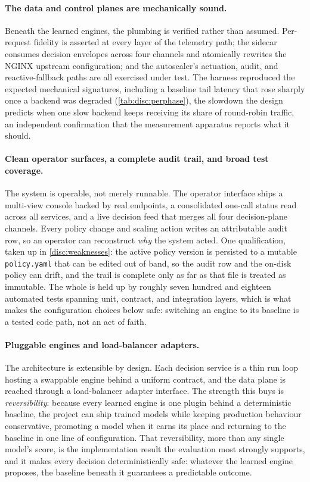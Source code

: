 \paragraph{The data and control planes are mechanically sound.} Beneath the learned
engines, the plumbing is verified rather than assumed. Per-request fidelity is
asserted at every layer of the telemetry path; the sidecar consumes decision
envelopes across four channels and atomically rewrites the NGINX upstream
configuration; and the autoscaler's actuation, audit, and reactive-fallback paths are
all exercised under test. The harness reproduced the expected mechanical signatures,
including a baseline tail latency that rose sharply once a backend was degraded
(\cref{tab:disc:perphase}), the slowdown the design predicts when one slow backend
keeps receiving its share of round-robin traffic, an independent confirmation that the
measurement apparatus reports what it should.

\paragraph{Clean operator surfaces, a complete audit trail, and broad test
coverage.} The system is operable, not merely runnable. The operator interface ships
a multi-view console backed by real endpoints, a consolidated one-call status read
across all services, and a live decision feed that merges all four decision-plane
channels. Every policy change and scaling action writes an attributable audit row, so
an operator can reconstruct \emph{why} the system acted. One qualification, taken up
in \cref{disc:weaknesses}: the active policy version is persisted to a mutable
\texttt{policy.yaml} that can be edited out of band, so the audit row and the on-disk
policy can drift, and the trail is complete only as far as that file is treated as
immutable. The whole is held up by roughly seven hundred and eighteen automated tests
spanning unit, contract, and integration layers, which is what makes the
configuration choices below safe: switching an engine to its baseline is a tested code
path, not an act of faith.

\paragraph{Pluggable engines and load-balancer adapters.} The architecture is
extensible by design. Each decision service is a thin run loop hosting a swappable
engine behind a uniform contract, and the data plane is reached through a
load-balancer adapter interface. The strength this buys is \emph{reversibility}:
because every learned engine is one plugin behind a deterministic baseline, the
project can ship trained models while keeping production behaviour conservative,
promoting a model when it earns its place and returning to the baseline in one line of
configuration. That reversibility, more than any single model's score, is the
implementation result the evaluation most strongly supports, and it makes every
decision deterministically safe: whatever the learned engine proposes, the baseline
beneath it guarantees a predictable outcome.

